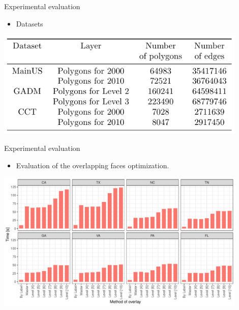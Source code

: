     \begin{frame}{Experimental evaluation}
        \begin{itemize}
            \item Datasets
        \end{itemize}
        \vspace{1cm}
        \centering
        \includegraphics[width=0.9\textwidth]{figures/sdcel_datasets}
    \end{frame}

    \begin{frame}{Experimental evaluation}
        \begin{itemize}
            \item Evaluation of the overlapping faces optimization.
        \end{itemize}
        \vspace{5mm}
        \centering
        \includegraphics[width=0.9\textwidth]{../thesis/chapterSDCEL/OverlayTester/Overlay_Tester}
    \end{frame}

